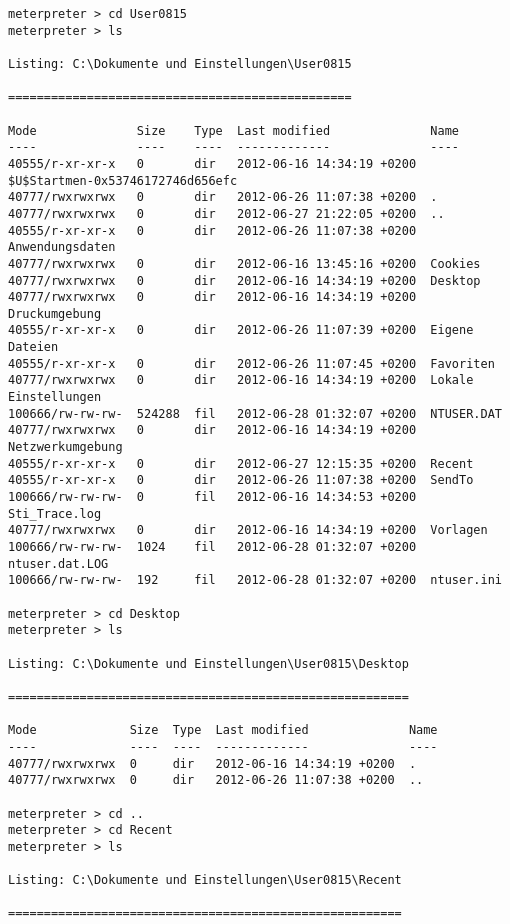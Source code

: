 \begin{lstlisting}[language=Metasploit]
meterpreter > cd User0815
meterpreter > ls

Listing: C:\Dokumente und Einstellungen\User0815

================================================

Mode              Size    Type  Last modified              Name
----              ----    ----  -------------              ----
40555/r-xr-xr-x   0       dir   2012-06-16 14:34:19 +0200  $U$Startmen-0x53746172746d656efc
40777/rwxrwxrwx   0       dir   2012-06-26 11:07:38 +0200  .
40777/rwxrwxrwx   0       dir   2012-06-27 21:22:05 +0200  ..
40555/r-xr-xr-x   0       dir   2012-06-26 11:07:38 +0200  Anwendungsdaten
40777/rwxrwxrwx   0       dir   2012-06-16 13:45:16 +0200  Cookies
40777/rwxrwxrwx   0       dir   2012-06-16 14:34:19 +0200  Desktop
40777/rwxrwxrwx   0       dir   2012-06-16 14:34:19 +0200  Druckumgebung
40555/r-xr-xr-x   0       dir   2012-06-26 11:07:39 +0200  Eigene Dateien
40555/r-xr-xr-x   0       dir   2012-06-26 11:07:45 +0200  Favoriten
40777/rwxrwxrwx   0       dir   2012-06-16 14:34:19 +0200  Lokale Einstellungen
100666/rw-rw-rw-  524288  fil   2012-06-28 01:32:07 +0200  NTUSER.DAT
40777/rwxrwxrwx   0       dir   2012-06-16 14:34:19 +0200  Netzwerkumgebung
40555/r-xr-xr-x   0       dir   2012-06-27 12:15:35 +0200  Recent
40555/r-xr-xr-x   0       dir   2012-06-26 11:07:38 +0200  SendTo
100666/rw-rw-rw-  0       fil   2012-06-16 14:34:53 +0200  Sti_Trace.log
40777/rwxrwxrwx   0       dir   2012-06-16 14:34:19 +0200  Vorlagen
100666/rw-rw-rw-  1024    fil   2012-06-28 01:32:07 +0200  ntuser.dat.LOG
100666/rw-rw-rw-  192     fil   2012-06-28 01:32:07 +0200  ntuser.ini

meterpreter > cd Desktop
meterpreter > ls

Listing: C:\Dokumente und Einstellungen\User0815\Desktop

========================================================

Mode             Size  Type  Last modified              Name
----             ----  ----  -------------              ----
40777/rwxrwxrwx  0     dir   2012-06-16 14:34:19 +0200  .
40777/rwxrwxrwx  0     dir   2012-06-26 11:07:38 +0200  ..

meterpreter > cd ..
meterpreter > cd Recent
meterpreter > ls

Listing: C:\Dokumente und Einstellungen\User0815\Recent

=======================================================


\end{lstlisting}
